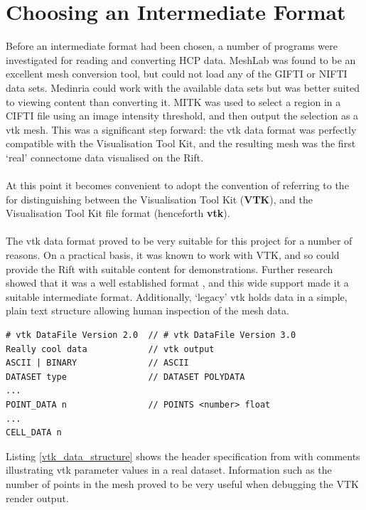 \documentclass[MSc,paper=a4,pagesize=auto]{icldt}
\begin{document}
\section{Choosing an Intermediate Format}
\label{sec:choosing_an_intermediate_format}
Before an intermediate format had been chosen, a number of programs were investigated for reading and converting HCP data. MeshLab \cite{MeshLab2014} was found to be an excellent mesh conversion tool, but could not load any of the GIFTI or NIFTI data sets. Medinria \cite{MedInria2014} could work with the available data sets but was better suited to viewing content than converting it. MITK \cite{MITK2014} was used to select a region in a CIFTI file using an image intensity threshold, and then output the selection as a vtk mesh. This was a significant step forward: the vtk data format was perfectly compatible with the Visualisation Tool Kit, and the resulting mesh was the first `real' connectome data visualised on the Rift.
\\ \\
At this point it becomes convenient to adopt the convention of referring to the for distinguishing between the Visualisation Tool Kit (\textbf{VTK}), and the Visualisation Tool Kit file format (henceforth \textbf{vtk}). 
\\\\
The vtk data format proved to be very suitable for this project for a number of reasons. On a practical basis, it was known to work with VTK, and so could provide the Rift with suitable content for demonstrations. Further research showed that it was a well established format \cite{VTK_file_formats}, and this wide support made it a suitable intermediate format. Additionally, `legacy' vtk holds data in a simple, plain text structure allowing human inspection of the mesh data. 

\begin{minipage}{\linewidth}
\begin{lstlisting}[label=vtk_data_structure, caption=The structure of data in a legacy .vtk file.]
# vtk DataFile Version 2.0  // # vtk DataFile Version 3.0
Really cool data            // vtk output
ASCII | BINARY              // ASCII
DATASET type                // DATASET POLYDATA
...
POINT_DATA n                // POINTS <number> float
...
CELL_DATA n
\end{lstlisting}
\end{minipage}
Listing \ref{vtk_data_structure} shows the header specification from \cite{VTK_file_formats} with comments illustrating vtk parameter values in a real dataset. Information such as the number of points in the mesh proved to be very useful when debugging the VTK render output.
\end{document}
